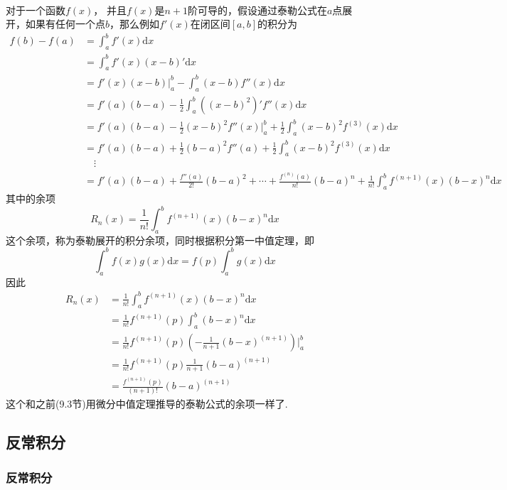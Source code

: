 \paragraph{}
对于一个函数$f(x)$， 并且$f(x)$是$n+1$阶可导的，假设通过泰勒公式在$a$点展开，如果有任何一个点$b$，那么例如$f'(x)$在闭区间$[a, b]$的积分为
\begin{align*}
f(b)  - f(a) & = \int_a^b f'(x)  \mathrm{d} x \\
& =  \int_a^b f'(x) (x - b)' \mathrm{d} x \\
& =  f'(x) (x - b) |_a^b - \int_a^b (x - b) f''(x) \mathrm{d} x \\
& =  f'(a)(b - a) - \frac{1}{2} \int_a^b ((x - b)^2)' f''(x) \mathrm{d} x \\
& =  f'(a)(b - a) - \frac{1}{2} (x-b)^2 f''(x)|_a^b + \frac{1}{2} \int_a^b (x - b)^2 f^{(3)}(x) \mathrm{d} x \\
& =  f'(a)(b - a) + \frac{1}{2} (b-a)^2 f''(a) + \frac{1}{2} \int_a^b (x - b)^2 f^{(3)}(x) \mathrm{d} x \\
& \quad \vdots \\
& = f'(a) (b - a) + \frac{f''(a)}{2!} (b - a)^2 + \cdots + \frac{f^{(n)}(a)}{n!} (b - a)^n + \frac{1}{n!} \int_a^b f^{(n+1)} (x) (b - x)^n \mathrm{d} x
\end{align*}
其中的余项
$$
R_n(x) = \frac{1}{n!} \int_a^b f^{(n+1)} (x) (b - x)^n \mathrm{d} x
$$
这个余项，称为泰勒展开的积分余项，同时根据积分第一中值定理，即
$$
\int_a^b f(x) g(x) \mathrm{d} x = f(p) \int_a^b g(x) \mathrm{d} x
$$
因此
\begin{align*}
R_n(x) & = \frac{1}{n!} \int_a^b f^{(n+1)} (x) (b - x)^n \mathrm{d} x \\
& =  \frac{1}{n!} f^{(n+1)}(p) \int_a^b (b - x)^n \mathrm{d} x \\
& = \frac{1}{n!} f^{(n+1)}(p)   (- \frac{1}{n+1} (b - x)^{(n + 1)})|_a^b \\
& = \frac{1}{n!} f^{(n+1)}(p) \frac{1}{n+1} (b - a)^{(n+1)} \\
& = \frac{f^{(n+1)}(p)}{(n+1)!} (b - a)^{(n+1)}
\end{align*}
这个和之前(9.3节)用微分中值定理推导的泰勒公式的余项一样了.


\subsection{反常积分}
\subsubsection{反常积分}
